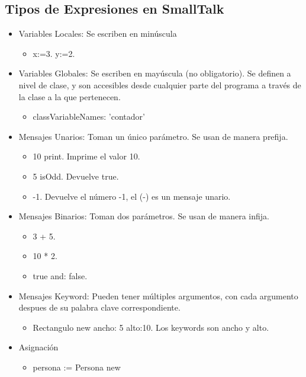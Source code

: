 \documentclass[10pt,a4paper]{article}
\begin{document}
\subsection*{Tipos de Expresiones en SmallTalk}
\begin{itemize}
    \item Variables Locales: Se escriben en minúscula 
    \begin{itemize}
        \item x:=3. y:=2.
    \end{itemize}
    \item Variables Globales: Se escriben en mayúscula (no obligatorio). Se definen a nivel de clase, y son accesibles desde cualquier parte del programa a través de la clase a la que pertenecen.
    \begin{itemize}
        \item classVariableNames: 'contador'
    \end{itemize}
    \item Mensajes Unarios: Toman un único parámetro. Se usan de manera prefija.
    \begin{itemize}
        \item 10 print. Imprime el valor 10.
        \item 5 isOdd. Devuelve true. 
        \item -1. Devuelve el número -1, el (-) es un mensaje unario.
    \end{itemize}
    \item Mensajes Binarios: Toman dos parámetros. Se usan de manera infija.
    \begin{itemize}
        \item 3 + 5.
        \item 10 * 2.
        \item true and: false. 
    \end{itemize}
    \item Mensajes Keyword: Pueden tener múltiples argumentos, con cada argumento despues de su palabra clave correspondiente. 
    \begin{itemize}
        \item Rectangulo new ancho: 5 alto:10. Los keywords son ancho y alto.
    \end{itemize}
    \item Asignación
    \begin{itemize}
        \item persona := Persona new
    \end{itemize}
\end{itemize}
\end{document}

